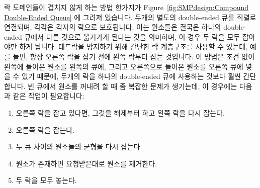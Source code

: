 락 도메인들이 겹치지 않게 하는 방법 한가지가
Figure~\ref{fig:SMPdesign:Compound Double-Ended Queue} 에 그려져 있습니다.
두개의 별도의 double-ended 큐를 직렬로 연결되며, 각각은 각자의 락으로
보호됩니다.
이는 원소들은 결국은 하나의 double-ended 큐에서 다른 것으로 옮겨가게 된다는
것을 의미하며, 이 경우 두 락을 모두 잡아야만 하게 됩니다.
데드락을 방지하기 위해 간단한 락 계층구조를 사용할 수 있는데, 예를 들면, 항상
오른쪽 락을 잡기 전에 왼쪽 락부터 잡는 것입니다.
이 방법은 조건 없이 왼쪽에 들어온 원소를 왼쪽의 큐에, 그리고 오른쪽으로 들어온
원소를 오른쪽 큐에 넣을 수 있기 때문에, 두개의 락을 하나의 double-ended 큐에
사용하는 것보다 훨씬 간단합니다.
빈 큐에서 원소를 꺼내려 할 때 좀 복잡한 문제가 생기는데, 이 경우에는 다음과
같은 작업이 필요합니다:

\begin{enumerate}
\item	오른쪽 락을 잡고 있다면, 그것을 해제부터 하고 왼쪽 락을 다시 잡는다.
\item	오른쪽 락을 잡는다.
\item	두 큐 사이의 원소들의 균형을 다시 잡는다.
\item	원소가 존재하면 요청받은대로 원소를 제거한다.
\item	두 락을 모두 놓는다.
\end{enumerate}

